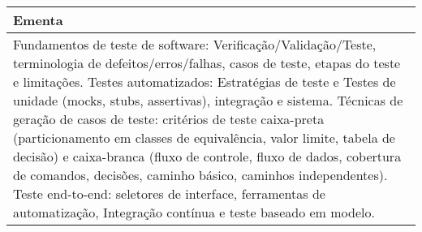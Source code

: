 \begin{quadro}[ht!]
\begin{tabular}{|p{3cm} p{2cm} p{3cm} p{2cm} p{3cm} p{2cm}|}
\multicolumn{6}{|p{15cm}|}{\cellcolor{blue1} Ementa} \\\hline
\hline\multicolumn{6}{|p{15cm}|}{\scriptsize Fundamentos de teste de software: Verificação/Validação/Teste, terminologia de defeitos/erros/falhas, casos de teste, etapas do teste e limitações. Testes automatizados: Estratégias de teste e Testes de unidade (mocks, stubs, assertivas), integração e sistema. Técnicas de geração de casos de teste: critérios de teste caixa-preta (particionamento em classes de equivalência, valor limite, tabela de decisão) e caixa-branca (fluxo de controle, fluxo de dados, cobertura de comandos, decisões, caminho básico, caminhos independentes). Teste end-to-end: seletores de interface, ferramentas de automatização, Integração contínua e teste baseado em modelo.}\\\hline 
\hline
	\end{tabular}
\end{quadro}


